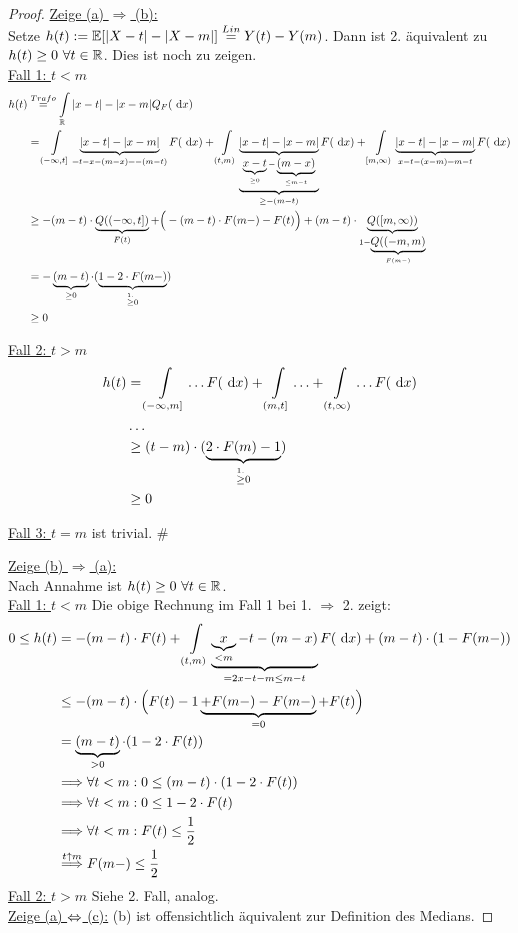 \begin{proof}
\underline{Zeige (a) $\Rightarrow$ (b):}\\
Setze $h(t):=\mathbb{E}[|X-t|-|X-m|]\stackrel{Lin}{=}Y(t)-Y(m)$. Dann ist 2. äquivalent zu $h(t)\geq0~\forall t\in\mathbb{R}$. Dies ist noch zu zeigen.\\

\underline{Fall 1: $t<m$}
\begin{align*}
h(t)&\stackrel{Trafo}{=}\int\limits_{\mathbb{R}}|x-t|-|x-m| Q_F(\text{ d} x)\\
&=\int\limits_{(-\infty,t]}\underbrace{|x-t|-|x-m|}_{=t-x-(m-x)=-(m-t)} F(\text{ d} x)
+\int\limits_{(t,m)}\underbrace{\underbrace{|x-t|-|x-m|}_{\underbrace{x-t}_{\geq0}-\underbrace{(m-x)}_{\leq m-t}}}_{\geq-(m-t)} F(\text{ d} x)
+\int\limits_{[m,\infty)}\underbrace{|x-t|-|x-m|}_{x-t-(x-m)=m-t} F(\text{ d} x)\\
&\geq-(m-t)\cdot \underbrace{Q((-\infty,t])}_{F(t)}+
\Big(-(m-t)\cdot F(m-)-F(t)\Big)
+(m-t)\cdot\underbrace{Q([m,\infty))}_{1-\underbrace{Q((-m,m)}_{F(m-)}}\\
&=-\underbrace{(m-t)}_{\geq0}\cdot(\underbrace{1-2\cdot F(m-)}_{\stackrel{1.}{\geq}0})\\
&\geq0
\end{align*}

\underline{Fall 2: $t> m$}
\begin{align*}
h(t)&=\int\limits_{(-\infty,m]}\ldots F(\text{ d} x)+\int\limits_{(m,t]}\ldots+\int\limits_{(t,\infty)}\ldots F(\text{ d} x)\\
&\ldots\\
&\geq(t-m)\cdot(\underbrace{2\cdot F(m)-1}_{\stackrel{1.}{\geq}0})\\
&\geq0
\end{align*}

\underline{Fall 3: $t=m$} ist trivial. $\#$

\underline{Zeige (b) $\Rightarrow$ (a):}\\
Nach Annahme ist $h(t)\geq0~\forall t\in\mathbb{R}$.\\

\underline{Fall 1: $t<m$} Die obige Rechnung im Fall 1 bei 1. $\Rightarrow$ 2. zeigt:
\begin{align*}
0\leq h(t)&=-(m-t)\cdot F(t)+\int\limits_{(t,m)}\underbrace{\underbrace{x}_{<m}-t-(m-x) }_{=2x-t-m\leq m-t}F(\text{ d} x)+(m-t)\cdot(1-F(m-))\\
&\leq-(m-t)\cdot\Big(F(t)-1\underbrace{+F(m-)-F(m-)}_{=0}+F(t)\Big)\\
&=\underbrace{(m-t)}_{>0}\cdot(1-2\cdot F(t))\\
&\Longrightarrow\forall t<m:0\leq(m-t)\cdot(1-2\cdot F(t))\\
&\Longrightarrow\forall t<m:0\leq 1-2\cdot F(t)\\
&\Longrightarrow\forall t<m:F(t)\leq\frac{1}{2}\\
&\stackrel{t\uparrow m}{\Longrightarrow}F(m-)\leq\frac{1}{2}
\end{align*}
\underline{Fall 2: $t> m$} Siehe 2. Fall, analog.\\

\underline{Zeige (a) $\Leftrightarrow$ (c):}
(b) ist offensichtlich äquivalent zur Definition des Medians.
\end{proof}

